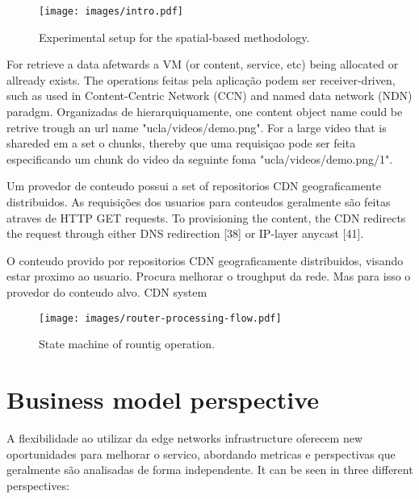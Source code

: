 
\begin{figure}
	\centering	
    \texttt{[image: images/intro.pdf]}
	\caption{Experimental setup for the spatial-based methodology.}
    \label{fig:fog-model}
\end{figure}

For retrieve a data afetwards a VM (or content, service, etc) being allocated or allready exists. The operations feitas pela aplicação podem ser receiver-driven, such as used in Content-Centric Network (CCN) and named data network (NDN) paradgm. 
Organizadas de hierarquiquamente, one content object name could be retrive trough an url name "ucla/videos/demo.png". For a large video that is shareded em a set o chunks, thereby  que uma requisiçao pode ser feita especificando um chunk do video  da seguinte foma "ucla/videos/demo.png/1".

Um provedor de conteudo possui a set of repositorios CDN geograficamente distribuidos. As requisições dos usuarios para conteudos geralmente são feitas atraves de HTTP GET requests. To provisioning the content, the CDN redirects the request through either DNS redirection [38] or IP-layer anycast [41]. 

O conteudo provido por repositorios CDN geograficamente distribuidos, visando estar proximo ao usuario. Procura melhorar o troughput da rede. Mas para isso o provedor do conteudo alvo.  CDN system


\begin{figure}
	\centering	
    \texttt{[image: images/router-processing-flow.pdf]}
	\caption{State machine of rountig operation.}
    \label{fig:fog-model}
\end{figure}

    
\section{Business model perspective}

A flexibilidade ao utilizar da edge networks infrastructure oferecem new oportunidades para melhorar o servico, abordando metricas e perspectivas que geralmente são analisadas de forma independente. It can be seen in three different perspectives:


